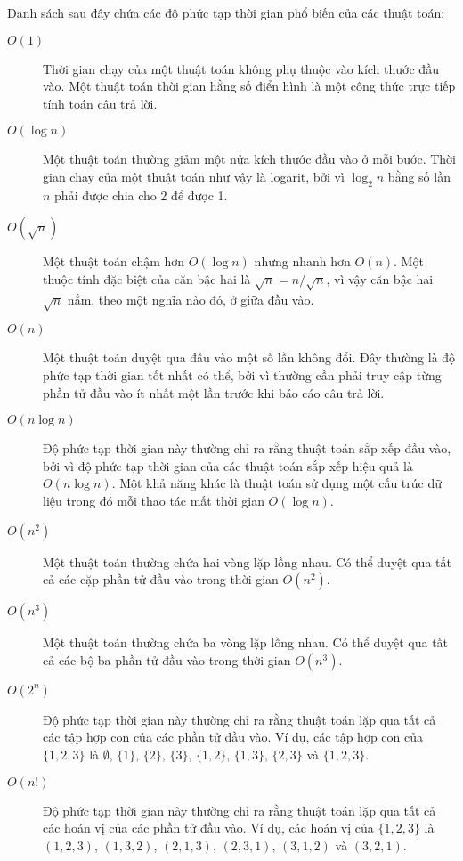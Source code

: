 
Danh sách sau đây chứa các độ phức tạp thời gian phổ biến
của các thuật toán:

\begin{description}
\item[$O(1)$]
Thời gian chạy của một thuật toán 
không phụ thuộc vào kích thước đầu vào.
Một thuật toán thời gian hằng số điển hình là một
công thức trực tiếp tính toán câu trả lời.

\item[$O(\log n)$]
Một thuật toán  thường
giảm một nửa kích thước đầu vào ở mỗi bước.
Thời gian chạy của một thuật toán như vậy
là logarit, bởi vì
$\log_2 n$ bằng số lần
$n$ phải được chia cho 2 để được 1.

\item[$O(\sqrt n)$]
Một thuật toán  chậm hơn
$O(\log n)$ nhưng nhanh hơn $O(n)$.
Một thuộc tính đặc biệt của căn bậc hai là
$\sqrt n = n/\sqrt n$, vì vậy căn bậc hai $\sqrt n$ nằm,
theo một nghĩa nào đó, ở giữa đầu vào.

\item[$O(n)$]
Một thuật toán  duyệt qua đầu vào
một số lần không đổi.
Đây thường là độ phức tạp thời gian tốt nhất có thể,
bởi vì thường cần phải truy cập từng
phần tử đầu vào ít nhất một lần trước khi
báo cáo câu trả lời.

\item[$O(n \log n)$]
Độ phức tạp thời gian này thường chỉ ra rằng
thuật toán sắp xếp đầu vào,
bởi vì độ phức tạp thời gian của các thuật toán
sắp xếp hiệu quả là $O(n \log n)$.
Một khả năng khác là thuật toán
sử dụng một cấu trúc dữ liệu trong đó mỗi thao tác
mất thời gian $O(\log n)$.

\item[$O(n^2)$]
Một thuật toán  thường chứa
hai vòng lặp lồng nhau.
Có thể duyệt qua tất cả các cặp
phần tử đầu vào trong thời gian $O(n^2)$.

\item[$O(n^3)$]
Một thuật toán  thường chứa
ba vòng lặp lồng nhau.
Có thể duyệt qua tất cả các bộ ba
phần tử đầu vào trong thời gian $O(n^3)$.

\item[$O(2^n)$]
Độ phức tạp thời gian này thường chỉ ra rằng
thuật toán lặp qua tất cả các
tập hợp con của các phần tử đầu vào.
Ví dụ, các tập hợp con của $\{1,2,3\}$ là
$\emptyset$, $\{1\}$, $\{2\}$, $\{3\}$, $\{1,2\}$,
$\{1,3\}$, $\{2,3\}$ và $\{1,2,3\}$.

\item[$O(n!)$]
Độ phức tạp thời gian này thường chỉ ra rằng
thuật toán lặp qua tất cả các
hoán vị của các phần tử đầu vào.
Ví dụ, các hoán vị của $\{1,2,3\}$ là
$(1,2,3)$, $(1,3,2)$, $(2,1,3)$, $(2,3,1)$,
$(3,1,2)$ và $(3,2,1)$.

\end{description}

